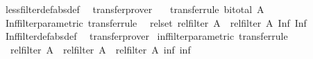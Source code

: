 \begin{isabellebody}
%
\isadelimproof
%
\endisadelimproof
%
\isatagproof
{}\isamarkupfalse%
\ less{\isacharunderscore}{\kern0pt}filter{\isacharunderscore}{\kern0pt}def{\isacharbrackleft}{\kern0pt}abs{\isacharunderscore}{\kern0pt}def{\isacharbrackright}{\kern0pt}\ \isamarkupfalse%
\ transfer{\isacharunderscore}{\kern0pt}prover%
\endisatagproof
{\isafoldproof}%
%
\isadelimproof
\isanewline
%
\endisadelimproof
\isanewline
{}\isamarkupfalse%
\isanewline
\ \ \ {\isacharbrackleft}{\kern0pt}transfer{\isacharunderscore}{\kern0pt}rule{\isacharbrackright}{\kern0pt}{\isacharcolon}{\kern0pt}\ {\isachardoublequoteopen}bi{\isacharunderscore}{\kern0pt}total\ A{\isachardoublequoteclose}\isanewline
{}\isanewline
\isanewline
{}\isamarkupfalse%
\ Inf{\isacharunderscore}{\kern0pt}filter{\isacharunderscore}{\kern0pt}parametric\ {\isacharbrackleft}{\kern0pt}transfer{\isacharunderscore}{\kern0pt}rule{\isacharbrackright}{\kern0pt}{\isacharcolon}{\kern0pt}\isanewline
\ \ {\isachardoublequoteopen}{\isacharparenleft}{\kern0pt}rel{\isacharunderscore}{\kern0pt}set\ {\isacharparenleft}{\kern0pt}rel{\isacharunderscore}{\kern0pt}filter\ A{\isacharparenright}{\kern0pt}\ {\isacharequal}{\kern0pt}{\isacharequal}{\kern0pt}{\isacharequal}{\kern0pt}{\isachargreater}{\kern0pt}\ rel{\isacharunderscore}{\kern0pt}filter\ A{\isacharparenright}{\kern0pt}\ Inf\ Inf{\isachardoublequoteclose}\isanewline
%
\isadelimproof
%
\endisadelimproof
%
\isatagproof
{}\isamarkupfalse%
\ Inf{\isacharunderscore}{\kern0pt}filter{\isacharunderscore}{\kern0pt}def{\isacharbrackleft}{\kern0pt}abs{\isacharunderscore}{\kern0pt}def{\isacharbrackright}{\kern0pt}\ \isamarkupfalse%
\ transfer{\isacharunderscore}{\kern0pt}prover%
\endisatagproof
{\isafoldproof}%
%
\isadelimproof
\isanewline
%
\endisadelimproof
\isanewline
{}\isamarkupfalse%
\ inf{\isacharunderscore}{\kern0pt}filter{\isacharunderscore}{\kern0pt}parametric\ {\isacharbrackleft}{\kern0pt}transfer{\isacharunderscore}{\kern0pt}rule{\isacharbrackright}{\kern0pt}{\isacharcolon}{\kern0pt}\isanewline
\ \ {\isachardoublequoteopen}{\isacharparenleft}{\kern0pt}rel{\isacharunderscore}{\kern0pt}filter\ A\ {\isacharequal}{\kern0pt}{\isacharequal}{\kern0pt}{\isacharequal}{\kern0pt}{\isachargreater}{\kern0pt}\ rel{\isacharunderscore}{\kern0pt}filter\ A\ {\isacharequal}{\kern0pt}{\isacharequal}{\kern0pt}{\isacharequal}{\kern0pt}{\isachargreater}{\kern0pt}\ rel{\isacharunderscore}{\kern0pt}filter\ A{\isacharparenright}{\kern0pt}\ inf\ inf{\isachardoublequoteclose}\isanewline

\end{isabellebody}
